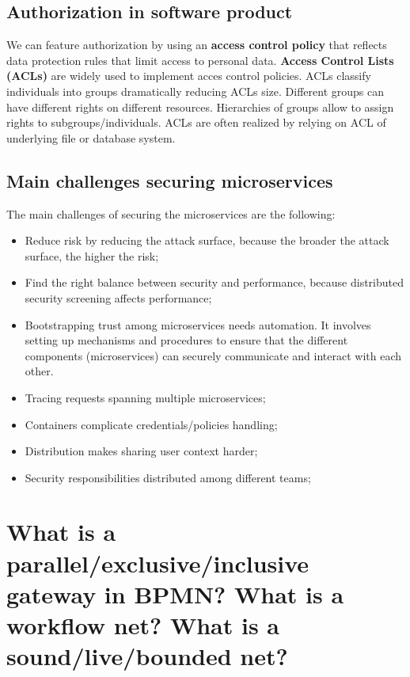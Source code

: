 \subsection{Authorization in software product}
We can feature authorization by using an \textbf{access control policy} that reflects data protection rules that limit access to personal data. \textbf{Access Control Lists (ACLs)} are widely used to implement acces control policies. ACLs classify individuals into groups dramatically reducing ACLs size. Different groups can have different rights on different resources. Hierarchies of groups allow to assign rights to subgroups/individuals. ACLs are often realized by relying on ACL of underlying file or database system.


\subsection{Main challenges securing microservices}
The main challenges of securing the microservices are the following:
\begin{itemize}
   \item Reduce risk by reducing the attack surface, because the broader the attack surface, the higher the risk;
   \item Find the right balance between security and performance, because distributed security screening affects performance;
   \item Bootstrapping trust among microservices needs automation. It involves setting up mechanisms and procedures to ensure that the different components (microservices) can securely communicate and interact with each other.
   \item Tracing requests spanning multiple microservices;
   \item Containers complicate credentials/policies handling;
   \item Distribution makes sharing user context harder;
   \item Security responsibilities distributed among different teams;
\end{itemize}

\section{What is a parallel/exclusive/inclusive gateway in BPMN? What is a workflow net? What is a sound/live/bounded net?}
